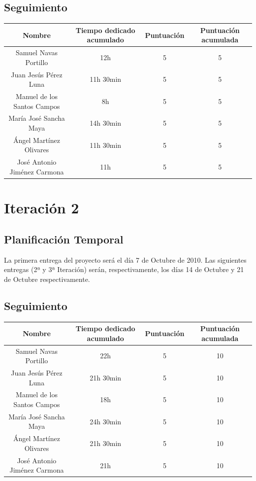 \documentclass[11 pt]{book}
\begin{document}
	\section{Seguimiento}
		\begin{tabular}{|c|c|c|c|}
			\hline
			Nombre & Tiempo dedicado acumulado & Puntuación & Puntuación acumulada\\
			\hline
			Samuel Navas Portillo & 12h & 5 & 5\\
			Juan Jesús Pérez Luna & 11h 30min & 5 & 5\\
			Manuel de los Santos Campos & 8h & 5 & 5\\
			María José Sancha Maya & 14h 30min & 5 & 5\\
			Ángel Martínez Olivares & 11h 30min & 5 & 5\\
			José Antonio Jiménez Carmona & 11h & 5 & 5\\
			\hline
		\end{tabular}
		
\chapter{Iteración 2}
	\section{Planificación Temporal}
		La primera entrega del proyecto será el día 7 de Octubre de 2010. Las siguientes entregas (2ª y 3ª Iteración) serán, respectivamente, los días 14 de Octubre y 21 de Octubre respectivamente.
		
	\section{Seguimiento}
		\begin{tabular}{|c|c|c|c|}
			\hline
			Nombre & Tiempo dedicado acumulado & Puntuación & Puntuación acumulada\\
			\hline
			Samuel Navas Portillo & 22h & 5 & 10\\
			Juan Jesús Pérez Luna & 21h 30min & 5 & 10\\
			Manuel de los Santos Campos & 18h & 5 & 10\\
			María José Sancha Maya & 24h 30min & 5 & 10\\
			Ángel Martínez Olivares & 21h 30min & 5 & 10\\
			José Antonio Jiménez Carmona & 21h & 5 & 10\\
			\hline
		\end{tabular}
\end{document}
